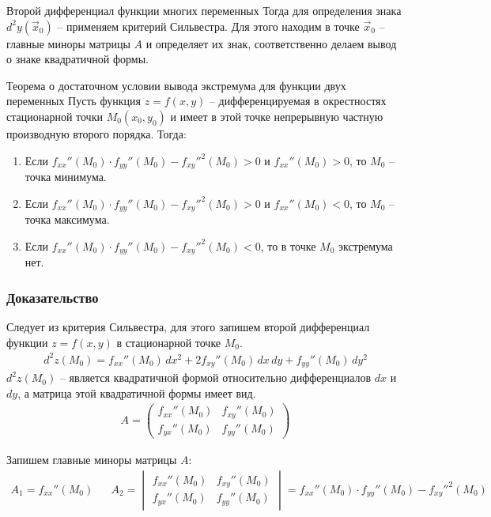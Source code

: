 \begin{tbox}{Второй дифференциал функции многих переменных}
	Тогда для определения знака $d^2 y (\vec{x}_0)$ -- применяем критерий Сильвестра. Для этого находим в точке $\vec{x}_0$ -- главные миноры матрицы $A$ и определяет их знак, соответственно делаем вывод о знаке квадратичной формы.
\end{tbox}

\begin{tbox}{Теорема о достаточном условии вывода экстремума для функции двух переменных}
	Пусть функция $z = f(x,y)$ -- дифференцируемая в окрестностях стационарной точки $M_0(x_0, y_0)$ и имеет в этой точке непрерывную частную производную второго порядка. Тогда:
	\begin{enumerate}
		\item Если $f_{xx}''(M_0) \cdot f_{yy}''(M_0) - {f_{xy}''}^2(M_0) >0$ и $f_{xx}''(M_0) > 0$, то $M_0$ -- точка минимума.
		\item Если $f_{xx}''(M_0) \cdot f_{yy}''(M_0) - {f_{xy}''}^2(M_0) >0$ и $f_{xx}''(M_0) < 0$, то $M_0$ -- точка максимума.
		\item Если $f_{xx}''(M_0) \cdot f_{yy}''(M_0) - {f_{xy}''}^2(M_0) < 0$, то в точке $M_0$ экстремума нет.
	\end{enumerate}

	\subsubsection*{Доказательство}
	Следует из критерия Сильвестра, для этого запишем второй дифференциал функции $z = f(x,y)$ в стационарной точке $M_0$.
	\begin{equation*}
		\begin{aligned}
			d^2 z (M_0) = f_{xx}''(M_0) \,dx^2 + 2 f_{xy}''(M_0) \,dx\, dy + f_{yy}''(M_0) \, dy^2
		\end{aligned}
	\end{equation*}
	$d^2 z(M_0)$ -- является квадратичной формой относительно дифференциалов $dx$ и $dy$, а матрица этой квадратичной формы имеет вид.
	\begin{equation*}
		\begin{aligned}
			A = \begin{pmatrix}
				f_{xx}''(M_0) & f_{xy}''(M_0) \\
				f_{yx}''(M_0) & f_{yy}''(M_0)
			\end{pmatrix}
		\end{aligned}
	\end{equation*}

	Запишем главные миноры матрицы $A$:
	\begin{equation*}
		\begin{aligned}
			A_1 = f_{xx}''(M_0) && A_2 = \begin{vmatrix}
				f_{xx}''(M_0) & f_{xy}''(M_0) \\
				f_{yx}''(M_0) & f_{yy}''(M_0)
			\end{vmatrix} = f_{xx}''(M_0) \cdot f_{yy}''(M_0) - {f_{xy}''}^2(M_0)
		\end{aligned}
	\end{equation*}


\end{tbox}
